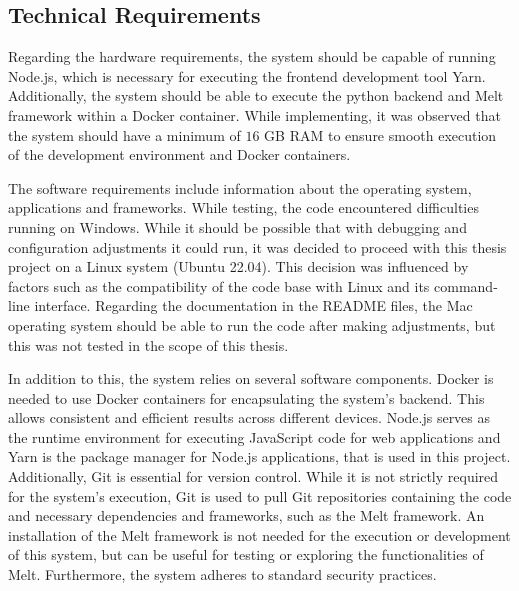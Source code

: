 \documentclass[../MasterThesis.tex]{subfiles}
\begin{document}
\subsection{Technical Requirements} \label{subsection:technicalrequirements}



Regarding the hardware requirements, the system should be capable of running Node.js, which is necessary for executing the frontend development tool Yarn. Additionally, the system should be able to execute the python backend and Melt framework within a Docker container.
While implementing, it was observed that the system should have a minimum of $16$ GB RAM to ensure smooth execution of the development environment and Docker containers.



The software requirements include information about the operating system, applications and frameworks.
While testing, the code encountered difficulties running on Windows. While it should be possible that with debugging and configuration adjustments it could run, it was decided to proceed with this thesis project on a Linux system (Ubuntu 22.04). This decision was influenced by factors such as the compatibility of the code base with Linux and its command-line interface.
Regarding the documentation in the README files, the Mac operating system should be able to run the code after making adjustments, but this was not tested in the scope of this thesis.


In addition to this, the system relies on several software components.
Docker is needed to use Docker containers for encapsulating the system's backend. This allows consistent and efficient results across different devices.
Node.js serves as the runtime environment for executing JavaScript code for web applications and Yarn is the package manager for Node.js applications, that is used in this project.
Additionally, Git is essential for version control. While it is not strictly required for the system's execution, Git is used to pull Git repositories containing the code and necessary dependencies and frameworks, such as the Melt framework. 
An installation of the Melt framework is not needed for the execution or development of this system, but can be useful for testing or exploring the functionalities of Melt.
%
Furthermore, the system adheres to standard security practices.
\end{document}
